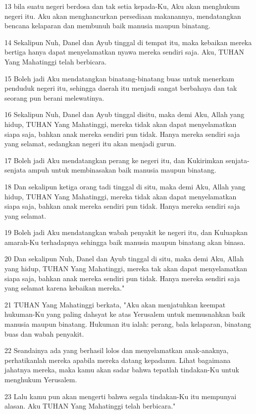 \par 13 bila suatu negeri berdosa dan tak setia kepada-Ku, Aku akan menghukum negeri itu. Aku akan menghancurkan persediaan makanannya, mendatangkan bencana kelaparan dan membunuh baik manusia maupun binatang.
\par 14 Sekalipun Nuh, Danel dan Ayub tinggal di tempat itu, maka kebaikan mereka bertiga hanya dapat menyelamatkan nyawa mereka sendiri saja. Aku, TUHAN Yang Mahatinggi telah berbicara.
\par 15 Boleh jadi Aku mendatangkan binatang-binatang buas untuk menerkam penduduk negeri itu, sehingga daerah itu menjadi sangat berbahaya dan tak seorang pun berani melewatinya.
\par 16 Sekalipun Nuh, Danel dan Ayub tinggal disitu, maka demi Aku, Allah yang hidup, TUHAN Yang Mahatinggi, mereka tidak akan dapat menyelamatkan siapa saja, bahkan anak mereka sendiri pun tidak. Hanya mereka sendiri saja yang selamat, sedangkan negeri itu akan menjadi gurun.
\par 17 Boleh jadi Aku mendatangkan perang ke negeri itu, dan Kukirimkan senjata-senjata ampuh untuk membinasakan baik manusia maupun binatang.
\par 18 Dan sekalipun ketiga orang tadi tinggal di situ, maka demi Aku, Allah yang hidup, TUHAN Yang Mahatinggi, mereka tidak akan dapat menyelamatkan siapa saja, bahkan anak mereka sendiri pun tidak. Hanya mereka sendiri saja yang selamat.
\par 19 Boleh jadi Aku mendatangkan wabah penyakit ke negeri itu, dan Kuluapkan amarah-Ku terhadapnya sehingga baik manusia maupun binatang akan binasa.
\par 20 Dan sekalipun Nuh, Danel dan Ayub tinggal di situ, maka demi Aku, Allah yang hidup, TUHAN Yang Mahatinggi, mereka tak akan dapat menyelamatkan siapa saja, bahkan anak mereka sendiri pun tidak. Hanya mereka sendiri saja yang selamat karena kebaikan mereka."
\par 21 TUHAN Yang Mahatinggi berkata, "Aku akan menjatuhkan keempat hukuman-Ku yang paling dahsyat ke atas Yerusalem untuk memusnahkan baik manusia maupun binatang. Hukuman itu ialah: perang, bala kelaparan, binatang buas dan wabah penyakit.
\par 22 Seandainya ada yang berhasil lolos dan menyelamatkan anak-anaknya, perhatikanlah mereka apabila mereka datang kepadamu. Lihat bagaimana jahatnya mereka, maka kamu akan sadar bahwa tepatlah tindakan-Ku untuk menghukum Yerusalem.
\par 23 Lalu kamu pun akan mengerti bahwa segala tindakan-Ku itu mempunyai alasan. Aku TUHAN Yang Mahatinggi telah berbicara."

